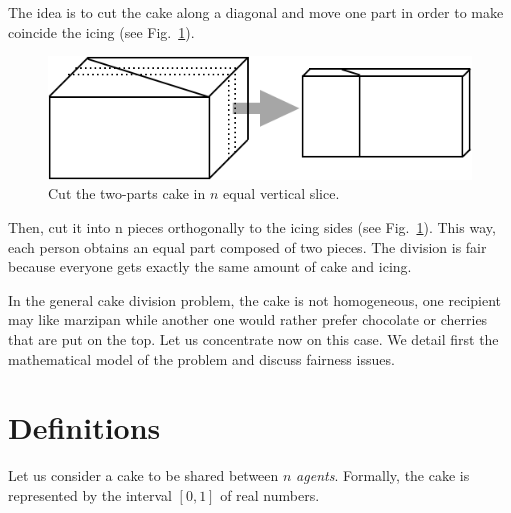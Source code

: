 \begin{itemize}
\begin{figure}[htb]
\end{figure}
The idea is to cut the cake along a diagonal and move one part in order to make coincide the icing
(see Fig.~\ref{Fig:cakeHomogeneous3}).
\begin{figure}[htb]
\begin{center}
        \includegraphics[scale=0.4]{FiguresMaths/CakeHomogeneous3}
        \caption{Cut the two-parts cake in $n$ equal vertical slice.}
        \label{Fig:cakeHomogeneous3}
\end{center}
\end{figure}
Then, cut it into n pieces orthogonally to the icing sides (see Fig.~\ref{Fig:cakeHomogeneous3}). 
This way, each person obtains an equal part composed of two pieces. 
The division is fair because everyone gets exactly the same amount of cake and icing. 
\end{itemize}

In the general cake division problem, the cake is not homogeneous, 
one recipient may like marzipan while another one would rather prefer chocolate or cherries
that are put on the top.
Let us concentrate now on this case.
We detail first the mathematical model of the problem and discuss fairness issues. 

\section{Definitions}

Let us consider a cake to be shared between $n$ \textit{agents}. 
Formally, the cake is represented by the interval $[0,1]$ of real numbers.

